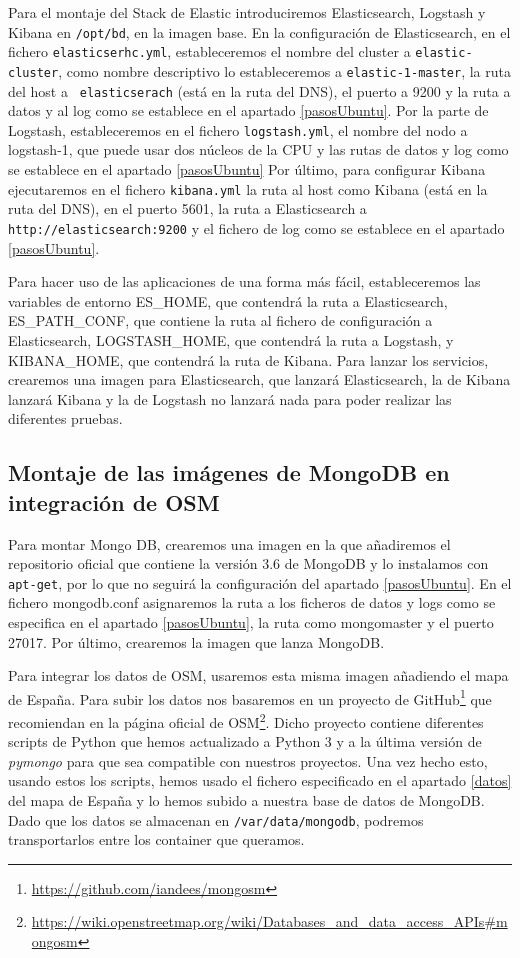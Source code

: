 Para el montaje del Stack de Elastic introduciremos Elasticsearch, Logstash
y Kibana en {\tt /opt/bd}, en la imagen base. En la configuración de
Elasticsearch, en el fichero {\tt elasticserhc.yml}, estableceremos el
nombre del cluster a {\tt elastic-cluster}, como nombre descriptivo lo
estableceremos a {\tt elastic-1-master}, la ruta del host a {\tt
  elasticserach} (está en la ruta del DNS), el puerto a 9200 y la ruta a
datos y al log como se establece en el apartado \ref{pasosUbuntu}. Por la
parte de Logstash, estableceremos en el fichero {\tt logstash.yml}, el
nombre del nodo a logstash-1, que puede usar dos núcleos de la CPU y las
rutas de datos y log como se establece en el apartado \ref{pasosUbuntu} Por
último, para configurar Kibana ejecutaremos en el fichero {\tt kibana.yml}
la ruta al host como Kibana (está en la ruta del DNS), en el puerto 5601,
la ruta a Elasticsearch a {\tt http://elasticsearch:9200} y el fichero de
log como se establece en el apartado \ref{pasosUbuntu}.

Para hacer uso de las aplicaciones de una forma más fácil, estableceremos
las variables de entorno ES\_HOME, que contendrá la ruta a Elasticsearch,
ES\_PATH\_CONF, que contiene la ruta al fichero de configuración a
Elasticsearch, LOGSTASH\_HOME, que contendrá la ruta a Logstash, y
KIBANA\_HOME, que contendrá la ruta de Kibana. Para lanzar los servicios,
crearemos una imagen para Elasticsearch, que lanzará Elasticsearch, la de
Kibana lanzará Kibana y la de Logstash no lanzará nada para poder realizar
las diferentes pruebas.

\subsection{Montaje de las imágenes de MongoDB en integración de
  OSM\label{montMongo}}

Para montar Mongo DB, crearemos una imagen en la que añadiremos el
repositorio oficial que contiene la versión 3.6 de MongoDB y lo instalamos
con {\tt apt-get}, por lo que no seguirá la configuración del apartado
\ref{pasosUbuntu}. En el fichero mongodb.conf asignaremos la ruta a los
ficheros de datos y logs como se especifica en el apartado
\ref{pasosUbuntu}, la ruta como mongomaster y el puerto 27017. Por último,
crearemos la imagen que lanza MongoDB.

Para integrar los datos de OSM, usaremos esta misma imagen añadiendo el
mapa de España. Para subir los datos nos basaremos en un proyecto de
GitHub\footnote{\url{https://github.com/iandees/mongosm}}
que recomiendan en la página oficial de
OSM\footnote{\url{https://wiki.openstreetmap.org/wiki/Databases\_and\_data\_access\_APIs\#mongosm}}.
Dicho proyecto contiene diferentes
scripts de Python que hemos actualizado a Python 3 y a la última versión
de \emph{pymongo} para que sea compatible
con nuestros proyectos. Una vez hecho esto, usando estos los scripts, hemos
usado el fichero especificado en el apartado \ref{datos} del mapa de España
y lo hemos subido a nuestra base de datos de MongoDB. Dado que los datos se
almacenan en {\tt /var/data/mongodb}, podremos transportarlos entre los
container que queramos.


